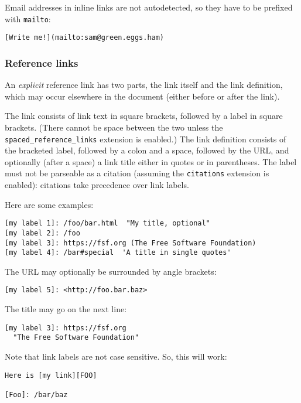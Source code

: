 \documentclass[
  a4paper,
]{article}
\begin{document}
Email addresses in inline links are not autodetected, so they have to be
prefixed with \texttt{mailto}:

\begin{verbatim}
[Write me!](mailto:sam@green.eggs.ham)
\end{verbatim}

\hypertarget{reference-links}{%
\subsubsection{Reference links}\label{reference-links}}

An \emph{explicit} reference link has two parts, the link itself and the
link definition, which may occur elsewhere in the document (either
before or after the link).

The link consists of link text in square brackets, followed by a label
in square brackets. (There cannot be space between the two unless the
\texttt{spaced\_reference\_links} extension is enabled.) The link
definition consists of the bracketed label, followed by a colon and a
space, followed by the URL, and optionally (after a space) a link title
either in quotes or in parentheses. The label must not be parseable as a
citation (assuming the \texttt{citations} extension is enabled):
citations take precedence over link labels.

Here are some examples:

\begin{verbatim}
[my label 1]: /foo/bar.html  "My title, optional"
[my label 2]: /foo
[my label 3]: https://fsf.org (The Free Software Foundation)
[my label 4]: /bar#special  'A title in single quotes'
\end{verbatim}

The URL may optionally be surrounded by angle brackets:

\begin{verbatim}
[my label 5]: <http://foo.bar.baz>
\end{verbatim}

The title may go on the next line:

\begin{verbatim}
[my label 3]: https://fsf.org
  "The Free Software Foundation"
\end{verbatim}

Note that link labels are not case sensitive. So, this will work:

\begin{verbatim}
Here is [my link][FOO]

[Foo]: /bar/baz
\end{verbatim}
\end{document}
